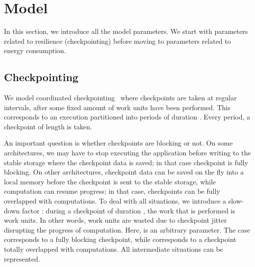 \documentclass[a4paper]{article}
\begin{document}
\section{Model}
\label{sec.model}

In this section, we introduce all the model parameters. We
start with parameters related to resilience (checkpointing)
before moving to parameters related to
energy consumption.

\subsection{Checkpointing}

We model coordinated checkpointing~\cite{CL85} where 
checkpoints are taken at regular intervals, after some fixed amount of
work units have been performed. This corresponds to an 
execution partitioned into periods of duration . Every period, 
a checkpoint of length  is taken.

An important question is
whether checkpoints are blocking or not.  On some architectures, we
may have to stop executing the application before writing to the
stable storage where the checkpoint data is saved; in that case
checkpoint is fully blocking.  On other architectures, checkpoint data
can be saved on the fly into a local memory before the checkpoint is
sent to the stable storage, while computation can resume progress; in
that case, checkpoints can be fully overlapped with computations.  To
deal with all situations, we introduce a slow-down factor
: during a checkpoint of duration , the work
that is performed is  work units. In other words,
 work units are wasted due to checkpoint
jitter disrupting the progress of computation.  Here,  is an arbitrary parameter.  The case
 corresponds to a fully blocking checkpoint, while
 corresponds to a checkpoint totally overlapped with computations.
All intermediate situations can be represented.
\end{document}
